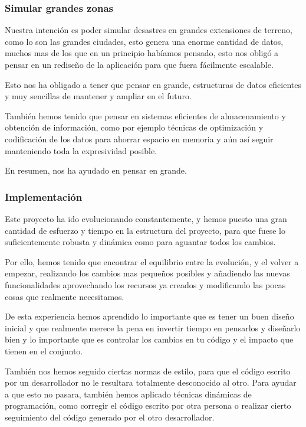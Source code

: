 \subsubsection*{Simular grandes zonas}
Nuestra intención es poder simular desastres en grandes extensiones de terreno,
como lo son las grandes ciudades, esto genera una enorme cantidad de datos,
muchos mas de los que en un principio habíamos pensado, esto nos obligó a
pensar en un rediseño de la aplicación para que fuera fácilmente escalable.

Esto nos ha obligado a tener que pensar en grande, estructuras de datos
eficientes y muy sencillas de mantener y ampliar en el futuro. 

También hemos tenido que pensar en sistemas eficientes de almacenamiento y
obtención de información, como por ejemplo técnicas de optimización y
codificación de los datos para ahorrar espacio en
memoria y aún así seguir manteniendo toda la expresividad posible.

En resumen, nos ha ayudado en pensar en grande.
\subsubsection*{Implementación}
Este proyecto ha ido evolucionando constantemente, y hemos puesto una gran
cantidad de esfuerzo y tiempo en la estructura del proyecto, para que fuese lo
suficientemente robusta y dinámica como para aguantar todos los cambios.

Por ello, hemos tenido que encontrar el equilibrio entre la evolución, y el
volver a empezar, realizando los cambios mas pequeños posibles y añadiendo las
nuevas funcionalidades aprovechando los recursos ya creados y modificando las
pocas cosas que realmente necesitamos.

De esta experiencia hemos aprendido lo importante que es tener un buen diseño
inicial y que realmente merece la pena en invertir tiempo en pensarlos y
diseñarlo bien y lo importante que es controlar los cambios en tu código y el
impacto que tienen en el conjunto.

También nos hemos seguido ciertas normas de estilo, para que 
el código escrito por un desarrollador no le resultara totalmente desconocido
al otro. Para ayudar a que esto no pasara, también hemos aplicado técnicas
dinámicas de programación, como corregir el código escrito por otra persona o
realizar cierto seguimiento del código generado por el otro desarrollador.

